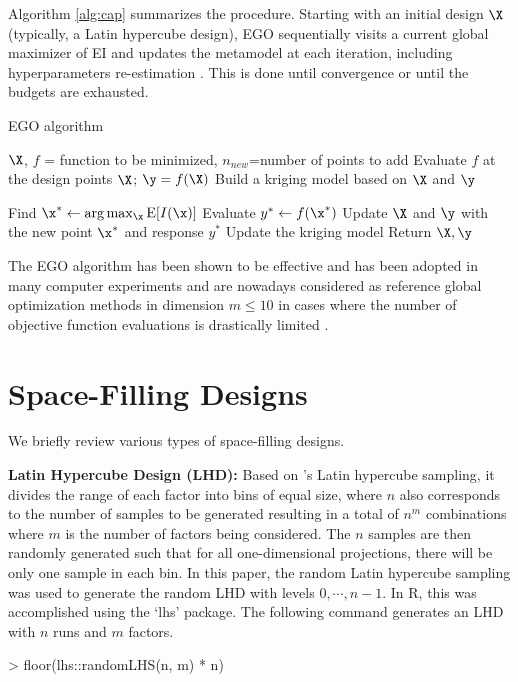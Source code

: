 \documentclass [PhD] {package/uclathes}
\begin{document}
Algorithm \ref{alg:cap} summarizes the procedure.
Starting with an initial design $\X$ (typically, a Latin hypercube design), EGO sequentially visits a current global maximizer of EI and updates the metamodel at each iteration, including hyperparameters re-estimation \parencite{roustant2012dicekriging}. This is done until convergence or until the budgets are exhausted.

\begin{algorithm}[H]
    \caption{EGO algorithm}\label{alg:cap}
    \begin{algorithmic}
        \Require $\X$, $f$ = function to be minimized, $n_{new}$=number of points to add
        \State Evaluate $f$ at the design points $\X$; $\y=f(\X)$
        \State Build a kriging model based on $\X$ and $\y$

        \State Find $\x^* \gets \arg\max_{\x}\mathrm{E}[I(\x)]$
        \State Evaluate $y^* \gets f(\x^*)$
        \State Update $\X$ and $\y$ with the new point $\x^*$ and response $y^*$
        \State Update the kriging model
\EndFor
\State Return $\X, \y$
\end{algorithmic}
\end{algorithm}

The EGO algorithm has been shown to be effective and has been adopted in many computer experiments and are nowadays considered as reference global optimization methods in dimension $m\le 10$ in cases where the number of objective function evaluations is drastically limited \parencite{jones2001taxonomy}.


\section{Space-Filling Designs}\label{sec:designs}
We briefly review various types of space-filling designs.

\textbf{Latin Hypercube Design (LHD):}
 Based on \textcite{mckay1992latin}'s Latin hypercube sampling, it divides the range of each factor into  bins of equal size, where $n$ also corresponds to the number of samples to be generated resulting in a total of $n^m$ combinations where $m$ is the number of factors  being considered. The $n$ samples are then randomly generated such that for all one-dimensional projections, there will be only one sample in each bin.
 In this paper, the random Latin hypercube sampling was used to generate the random LHD  with levels $0,\cdots,n-1$. In R, this was accomplished using the `lhs' package. The following command generates an LHD with $n$ runs and $m$ factors.
\begin{Schunk}
\begin{Sinput}
> floor(lhs::randomLHS(n, m) * n)
\end{Sinput}
\end{Schunk}
\end{document}

